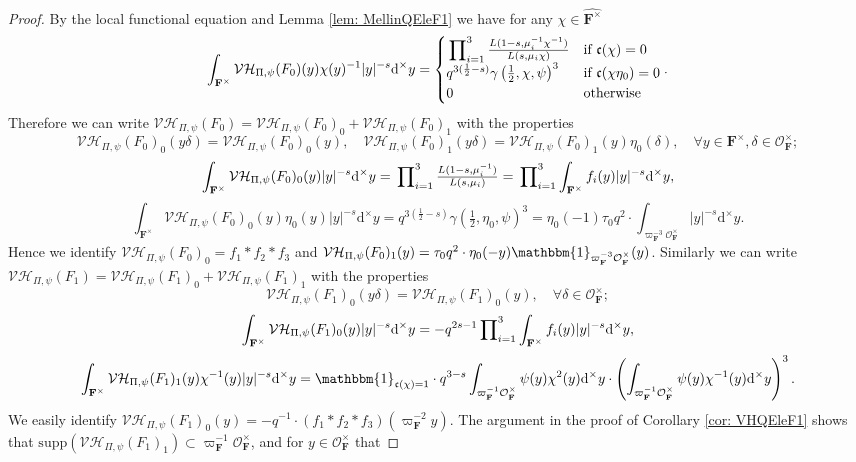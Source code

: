\documentclass[A4]{amsart}
\numberwithin{equation}{section} \everymath{\displaystyle}
\newcommand{\id}{\mathbbm{1}}
\newcommand{\ud}{\mathrm{d}}
\newcommand{\F}{\mathbf{F}}
\newcommand{\vO}{\mathcal{O}}
\newcommand{\norm}[1][\cdot]{\lvert #1 \rvert}
\newcommand{\VorH}{\mathcal{VH}}
\newcommand{\cond}{\mathfrak{c}}
\begin{document}
\begin{proof}
	By the local functional equation and Lemma \ref{lem: MellinQEleF1} we have for any $\chi \in \widehat{\F^{\times}}$
	$$ \int_{\F^{\times}} \VorH_{\Pi,\psi}(F_0)(y) \chi(y)^{-1} \norm[y]^{-s} \ud^{\times} y = \begin{cases}
		\sideset{}{_{i=1}^3} \prod \tfrac{L(1-s, \mu_i^{-1}\chi^{-1})}{L(s, \mu_i \chi)} & \text{if } \cond(\chi) = 0 \\
		q^{3(\frac{1}{2}-s)} \gamma \left( \tfrac{1}{2}, \chi, \psi \right)^3 & \text{if } \cond(\chi \eta_0) = 0 \\
		0 & \text{otherwise}
	\end{cases}. $$
	Therefore we can write $\VorH_{\Pi,\psi}(F_0) = \VorH_{\Pi,\psi}(F_0)_0 + \VorH_{\Pi,\psi}(F_0)_1$ with the properties
	$$ \VorH_{\Pi,\psi}(F_0)_0(y \delta) = \VorH_{\Pi,\psi}(F_0)_0(y), \quad \VorH_{\Pi,\psi}(F_0)_1(y\delta) = \VorH_{\Pi,\psi}(F_0)_1(y) \eta_0(\delta), \quad \forall y \in \F^{\times}, \delta \in \vO_{\F}^{\times}; $$
	$$ \int_{\F^{\times}} \VorH_{\Pi,\psi}(F_0)_0(y) \norm[y]^{-s} \ud^{\times} y = \sideset{}{_{i=1}^3} \prod \tfrac{L(1-s, \mu_i^{-1})}{L(s, \mu_i)} = \sideset{}{_{i=1}^3} \prod \int_{\F^{\times}} f_i(y) \norm[y]^{-s} \ud^{\times} y, $$
	$$ \int_{\F^{\times}} \VorH_{\Pi,\psi}(F_0)_0(y) \eta_0(y) \norm[y]^{-s} \ud^{\times} y = q^{3(\frac{1}{2}-s)} \gamma \left( \tfrac{1}{2}, \eta_0, \psi \right)^3 = \eta_0(-1) \tau_0 q^2 \cdot \int_{\varpi_{\F}^{-3} \vO_{\F}^{\times}} \norm[y]^{-s} \ud^{\times} y. $$
	Hence we identify $\VorH_{\Pi,\psi}(F_0)_0 = f_1*f_2*f_3$ and $\VorH_{\Pi,\psi}(F_0)_1(y) = \tau_0 q^2 \cdot \eta_0(-y) \id_{\varpi_{\F}^{-3} \vO_{\F}^{\times}}(y)$. Similarly we can write $\VorH_{\Pi,\psi}(F_1) = \VorH_{\Pi,\psi}(F_1)_0 + \VorH_{\Pi,\psi}(F_1)_1$ with the properties
	$$ \VorH_{\Pi,\psi}(F_1)_0(y \delta) = \VorH_{\Pi,\psi}(F_1)_0(y), \quad \forall \delta \in \vO_{\F}^{\times}; $$
	$$ \int_{\F^{\times}} \VorH_{\Pi,\psi}(F_1)_0(y) \norm[y]^{-s} \ud^{\times} y = - q^{2s-1} \sideset{}{_{i=1}^3} \prod \int_{\F^{\times}} f_i(y) \norm[y]^{-s} \ud^{\times} y, $$
	$$ \int_{\F^{\times}} \VorH_{\Pi,\psi}(F_1)_1(y) \chi^{-1}(y) \norm[y]^{-s} \ud^{\times} y = \id_{\cond(\chi)=1} \cdot q^{3-s} \int_{\varpi_{\F}^{-1} \vO_{\F}^{\times}} \psi(y) \chi^2(y) \ud^{\times}y \cdot \left( \int_{\varpi_{\F}^{-1} \vO_{\F}^{\times}} \psi(y) \chi^{-1}(y) \ud^{\times}y \right)^3. $$
	We easily identify $\VorH_{\Pi,\psi}(F_1)_0(y) = -q^{-1} \cdot (f_1*f_2*f_3)(\varpi_{\F}^{-2}y)$. The argument in the proof of Corollary \ref{cor: VHQEleF1} shows that $\mathrm{supp} \left( \VorH_{\Pi,\psi}(F_1)_1 \right) \subset \varpi_{\F}^{-1} \vO_{\F}^{\times}$, and for $y \in \vO_{\F}^{\times}$ that

\end{proof}
\end{document}
